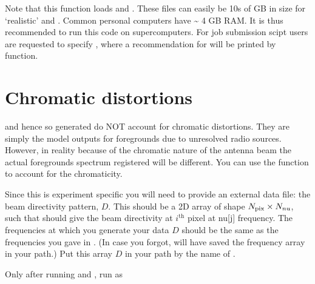 \documentclass[letterpaper,10pt,english]{sphinxmanual}
\begin{document}
\sphinxAtStartPar
Note that this function loads  and .
These files can easily be 10s of GB in size for ‘realistic’ 
and . Common personal computers have \textasciitilde{} 4 GB RAM. It is thus
recommended to run this code on supercomputers. For job submission scipt
users are requested to specify ,
where a recommendation for  will be printed by
 function.


\section{Chromatic distortions}
\label{\detokenize{detexp:chromatic-distortions}}
\sphinxAtStartPar
{} and hence  so generated do NOT account for
chromatic distortions. They are simply the model outputs for foregrounds
due to unresolved radio sources. However, in reality because of the
chromatic nature of the antenna beam the actual foregrounds spectrum
registered will be different. You can use the function
 to account for the chromaticity.

\sphinxAtStartPar
Since this is experiment specific you will need to provide an external
data file: the beam directivity pattern, \(D\). This should be a 2D array
of shape \(N_{\mathrm{pix}}\times N_{\\nu}\), such that  should
give the beam directivity at \(i^{\mathrm{th}}\) pixel at nu{[}j{]} frequency.
The frequencies at which you generate your data \(D\) should be the same
as the frequencies you gave in . (In case you forgot,
 will have saved the frequency array in your 
path.) Put this array \(D\) in your  path by the name of
.

\sphinxAtStartPar
Only after running  and , run 
as
\end{document}
